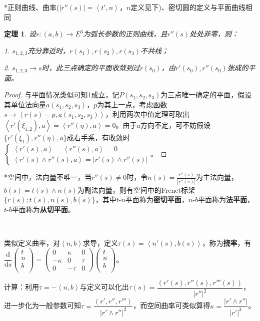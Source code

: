 \documentclass[a4paper,UTF8,fontset=windows]{ctexart}
\newtheorem{thm}{定理}[section]
\begin{document}
*正则曲线、曲率($|r''(s)|=\left<t',n\right>$，$n$定义见下)、密切圆的定义与平面曲线相同

\begin{thm}
设$r:(a,b)\to E^3$为弧长参数的正则曲线，且$r''(s)$处处非零，则：

1. $s_{1,2,3}$充分靠近时，$r(s_1),r(s_2),r(s_3)$不共线；

2. $s_{1,2,3}\to s$时，此三点确定的平面收敛到过$r(s_0)$，由$r'(s_0),r''(s_0)$张成的平面。
\end{thm}

\begin{proof}
与平面情况类似可知1成立，记$P(s_1,s_2,s_3)$为三点唯一确定的平面，假设其单位法向量$a(s_1,s_2,s_3)$，$p$为其上一点，考虑函数$s\to\left<r(s)-p,a(s_1,s_2,s_3)\right>$，利用两次中值定理可取出$\left<r'(\xi_{1,2}),a\right>=\left<r''(\eta),a\right>=0$。由于$a$方向不定，可不妨假设$\{r'(\xi_1),r''(\eta),a\}$成右手系，有收敛时$\begin{cases}\left<r'(s),a\right>=\left<r''(s),a\right>=0\\\left<r'(s)\wedge r''(s),a\right>=|r'(s)\wedge r''(s)|\end{cases}$。
\end{proof}

*空间中，法向量不唯一，当$r''(s)\ne 0$时，令$n(s)=\frac{r''(s)}{|r''(s)|}$为主法向量，$b(s)=t(s)\wedge n(s)$为副法向量，则有空间中的Frenet标架$\{r(s);t(s),n(s),b(s)\}$，其中$t$-$n$平面称为\textbf{密切平面}，$n$-$b$平面称为\textbf{法平面}，$t$-$b$平面称为\textbf{从切平面}。

\

类似定义曲率，对$\left<n,b\right>$求导，定义$\tau(s)=\left<n'(s),b(s)\right>$，称为\textbf{挠率}，有$\dfrac{\mathrm{d}}{\mathrm{d}s}\begin{pmatrix}t\\n\\b\\\end{pmatrix}=\begin{pmatrix}0&\kappa&0\\-\kappa&0&\tau\\0&-\tau&0\end{pmatrix}\begin{pmatrix}t\\n\\b\\\end{pmatrix}$。

计算：利用$\tau=-\left<n,b\right>$与定义可以化出$\tau(s)=\dfrac{(r'(s),r''(s),r'''(s))}{|r''|^2}$，进一步化为一般参数可知$\tau=\dfrac{(r',r'',r''')}{|r'\wedge r''|^2}$，而空间曲率可类似算得$\kappa=\dfrac{|r'\wedge r''|}{|r'|^3}$。
\end{document}
